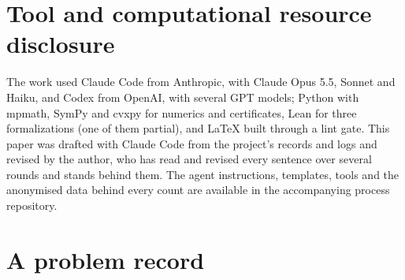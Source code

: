 \documentclass[11pt]{amsart}
\newcommand*{\sectionbreak}{\clearpage} %
\begin{document}
\section*{Tool and computational resource disclosure}

The work used Claude Code from Anthropic, with Claude Opus 5.5, Sonnet and
Haiku, and Codex from OpenAI, with several GPT models; Python with mpmath,
SymPy and cvxpy for numerics and certificates, Lean for three formalizations
(one of them partial), and LaTeX built through a lint gate. This paper was
drafted with Claude Code from the project's records and logs and revised by the
author, who has read and revised every sentence over several rounds and stands
behind them. The agent instructions, templates, tools and the anonymised data
behind every count are available in the accompanying process repository.

\appendix
\sectionbreak
\section{A problem record}\label{app:record}
\end{document}
